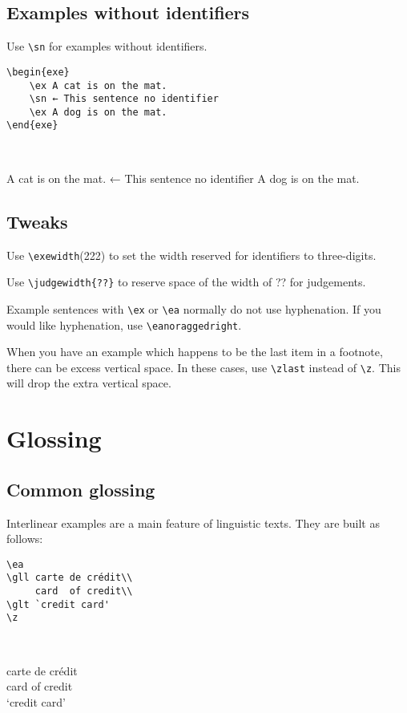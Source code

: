 \documentclass[output=paper]{langscibook}
\newcommand{\cmd}[1]{\texttt{\textbackslash#1}}
\begin{document}
\subsection{Examples without identifiers}
Use \cmd{sn} for examples without identifiers.

\begin{minipage}[t]{.55\textwidth}
\begin{lstlisting}
\begin{exe}
    \ex A cat is on the mat.
    \sn ← This sentence no identifier
    \ex A dog is on the mat.
\end{exe}
 \end{lstlisting}
\end{minipage}~
\parbox[t]{.45\textwidth}{
\begin{exe}
    \ex A cat is on the mat.
    \sn ← This sentence no identifier
    \ex A dog is on the mat.
\end{exe}
}

\subsection{Tweaks}
Use \cmd{exewidth}{(222)} to set the width reserved for identifiers to three-digits.

Use \cmd{judgewidth\{??\}} to reserve space of the width of ?? for judgements.

Example sentences with \cmd{ex} or \cmd{ea} normally do not use hyphenation. If you would like hyphenation, use \cmd{eanoraggedright}.

When you have an example which happens to be the last item in a footnote, there can be excess vertical space. In these cases, use \cmd{zlast} instead of \cmd{z}. This will drop the extra vertical space.


\section{Glossing}
\subsection{Common glossing}
Interlinear examples are a main feature of linguistic texts. They are built as follows:

\begin{minipage}[t]{.55\textwidth}
\begin{lstlisting}
\ea
\gll carte de crédit\\
     card  of credit\\
\glt `credit card'
\z
 \end{lstlisting}
\end{minipage}~
\parbox[t]{.45\textwidth}{
\ea
\gll carte de crédit\\
     card  of credit\\
\glt `credit card'
\z
}
\end{document}
